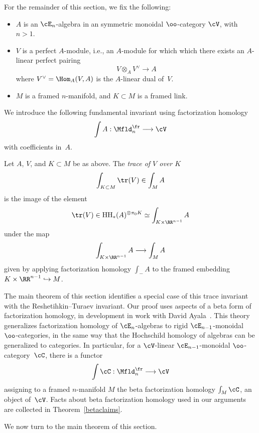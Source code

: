 \documentclass[10pt]{amsart}
\begin{document}
For the remainder of this section, we fix the following:
\begin{itemize}

\item $A$ is an $\cE_n$-algebra in an symmetric monoidal $\oo$-category $\cV$, with $n>1$.

\item $V$ is a perfect $A$-module, i.e., an $A$-module for which which there exists an $A$-linear perfect pairing
\[
V \otimes_A V^\vee \longrightarrow A
\]
where $V^\vee = \Hom_A(V,A)$ is the $A$-linear dual of~$V$.

\item $M$ is a framed $n$-manifold, and $K\subset M$ is a framed link.

\end{itemize}
We introduce the following fundamental invariant using factorization homology
    \[
    \int A: \Mfld_n^{\fr}\longrightarrow \cV
    \]
with coefficients in~$A$.

\begin{dfn}
Let $A$, $V$, and $K\subset M$ be as above. 
The {\em trace of $V$ over $K$}
\[
\displaystyle\int_{K\subset M}\tr(V) \in \displaystyle\int_M A
\]
is the image of the element
\[
\tr(V)\in {\rm HH}_\ast(A)^{\otimes \pi_0 K} \simeq \displaystyle\int_{K\times\RR^{n-1}}A
\]
under the map
\[
\displaystyle\int_{K\times\RR^{n-1}}A \longrightarrow \displaystyle\int_{M}A    
\]
given by applying factorization homology $\int_{-} A$ to the framed embedding $K\times\RR^{n-1}\hookrightarrow M$.
\end{dfn}

The main theorem of this section identifies a special case of this trace invariant with the Reshetihkin--Turaev invariant. 
Our proof uses aspects of a beta form of factorization homology, 
in development in work with David Ayala~\cite{AF.tangle.fact}. 
This theory generalizes factorization homology of $\cE_n$-algebras to rigid $\cE_{n-1}$-monoidal $\oo$-categories, 
in the same way that the Hochschild homology of algebras can be generalized to categories. 
In particular, for a $\cV$-linear $\cE_{n-1}$-monoidal $\oo$-category~$\cC$, 
there is a functor
\[
\int\cC: \Mfld_n^{\fr}\longrightarrow \cV
\]
assigning to a framed $n$-manifold $M$ the beta factorization homology $\int_M \cC$, an object of~$\cV$.
Facts about beta factorization homology used in our arguments are collected in Theorem~\ref{betaclaims}. 

We now turn to the main theorem of this section.
\end{document}
